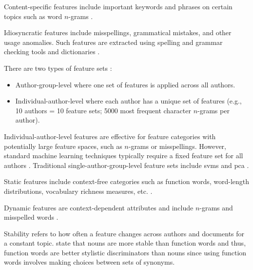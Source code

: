 \begin{definition}
    Content-specific features include important keywords and phrases on certain topics such as word $n$-grams \cite{abbasi_writeprints_2008}.
\end{definition}

\begin{definition}
    Idiosyncratic features include misspellings, grammatical mistakes, and other usage anomalies.
    Such features are extracted using spelling and grammar checking tools and dictionaries \cite{abbasi_writeprints_2008}.
\end{definition}

\begin{definition}
    There are two types of feature sets \cite{abbasi_writeprints_2008}:
    \begin{itemize}
        \item Author-group-level where one set of features is applied across all authors.
        \item Individual-author-level where each author has a unique set of features (e.g., 10 authors = 10 feature sets; 5000 most frequent character $n$-grams per author).
    \end{itemize}
    Individual-author-level features are effective for feature categories with potentially large feature spaces, such as $n$-grams or misspellings.
    However, standard machine learning techniques typically require a fixed feature set for all authors \cite{abbasi_writeprints_2008}.
    Traditional single-author-group-level feature sets include \acp{svm} and \ac{pca} \cite{abbasi_writeprints_2008}.
\end{definition}

\begin{definition}
    Static features include context-free categories such as function words, 
    word-length distributions, vocabulary richness measures, etc. \cite{abbasi_writeprints_2008}.
\end{definition}

\begin{definition}
    Dynamic features are context-dependent attributes and include $n$-grams and misspelled words \cite{abbasi_writeprints_2008}.
\end{definition}

\begin{definition}
    [Stability]
    Stability refers to how often a feature changes across authors and documents for a constant topic.
    \citet{abbasi_writeprints_2008} state that nouns are more stable than function words and thus, 
    function words are better stylistic discriminators than nouns 
    since using function words involves making choices between sets of synonyms.
\end{definition}

